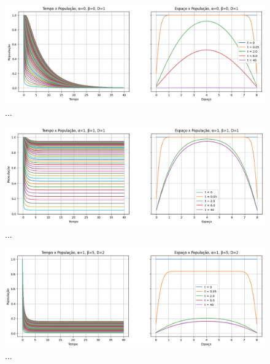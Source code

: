 \documentclass{article}
\begin{document}
 
 
 	\begin{figure}[h]
 		\centering
 		\includegraphics[scale=0.35]{L8-alpha0-beta0-D1}
 		\caption{...}
 		\label{fig:L8-alpha0-beta0-D1}
 	\end{figure}
 
 	\begin{figure}[h]
 		\centering
 		\includegraphics[scale=0.35]{L8-alpha1-beta1-D1}
 		\caption{...}
 		\label{fig:L8-alpha1-beta1-D1}
 	\end{figure}
 
 	\begin{figure}[h]
 		\centering
 		\includegraphics[scale=0.35]{L8-alpha1-beta5-D2}
 		\caption{...}
 		\label{fig:L8-alpha1-beta5-D2}
 	\end{figure}
 
\end{document}
